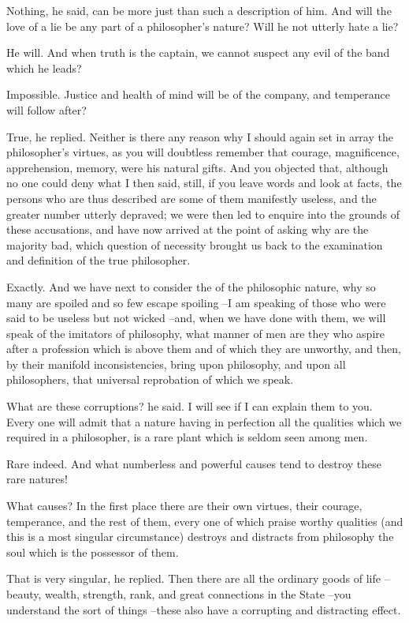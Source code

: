Nothing, he said, can be more just than such a description of him.
And will the love of a lie be any part of a philosopher's nature? Will he not utterly hate a lie?

He will.
And when truth is the captain, we cannot suspect any evil of the band which he leads?

Impossible.
Justice and health of mind will be of the company, and temperance will follow after?

True, he replied.
Neither is there any reason why I should again set in array the philosopher's virtues, as you will doubtless remember that courage, magnificence, apprehension, memory, were his natural gifts. And you objected that, although no one could deny what I then said, still, if you leave words and look at facts, the persons who are thus described are some of them manifestly useless, and the greater number utterly depraved; we were then led to enquire into the grounds of these accusations, and have now arrived at the point of asking why are the majority bad, which question of necessity brought us back to the examination and definition of the true philosopher.

Exactly.
And we have next to consider the of the philosophic nature, why so many are spoiled and so few escape spoiling --I am speaking of those who were said to be useless but not wicked --and, when we have done with them, we will speak of the imitators of philosophy, what manner of men are they who aspire after a profession which is above them and of which they are unworthy, and then, by their manifold inconsistencies, bring upon philosophy, and upon all philosophers, that universal reprobation of which we speak.

What are these corruptions? he said.
I will see if I can explain them to you. Every one will admit that a nature having in perfection all the qualities which we required in a philosopher, is a rare plant which is seldom seen among men.

Rare indeed.
And what numberless and powerful causes tend to destroy these rare natures!

What causes?
In the first place there are their own virtues, their courage, temperance, and the rest of them, every one of which praise worthy qualities (and this is a most singular circumstance) destroys and distracts from philosophy the soul which is the possessor of them.

That is very singular, he replied.
Then there are all the ordinary goods of life --beauty, wealth, strength, rank, and great connections in the State --you understand the sort of things --these also have a corrupting and distracting effect.


